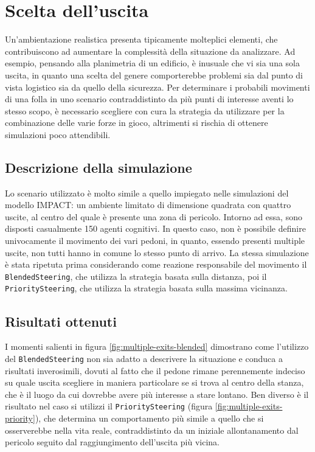 \section{Scelta dell'uscita}
Un'ambientazione realistica presenta tipicamente molteplici elementi, che contribuiscono ad aumentare la complessità della situazione da analizzare. \newline 
Ad esempio, pensando alla planimetria di un edificio, è inusuale che vi sia una sola uscita, in quanto una scelta del genere comporterebbe problemi sia dal punto di vista logistico sia da quello della sicurezza. \newline
Per determinare i probabili movimenti di una folla in uno scenario contraddistinto da più punti di interesse aventi lo stesso scopo, è necessario scegliere con cura la strategia da utilizzare per la combinazione delle varie forze in gioco, altrimenti si rischia di ottenere simulazioni poco attendibili.

\subsection{Descrizione della simulazione}
Lo scenario utilizzato è molto simile a quello impiegato nelle simulazioni del modello IMPACT: un ambiente limitato di dimensione quadrata con quattro uscite, al centro del quale è presente una zona di pericolo. Intorno ad essa, sono disposti casualmente 150 agenti cognitivi. \newline
In questo caso, non è possibile definire univocamente il movimento dei vari pedoni, in quanto, essendo presenti multiple uscite, non tutti hanno in comune lo stesso punto di arrivo. \newline
La stessa simulazione è stata ripetuta prima considerando come reazione responsabile del movimento il \texttt{BlendedSteering}, che utilizza la strategia basata sulla distanza, poi il \texttt{PrioritySteering}, che utilizza la strategia basata sulla massima vicinanza.

\subsection{Risultati ottenuti}
I momenti salienti in figura \ref{fig:multiple-exits-blended} dimostrano come l'utilizzo del \texttt{BlendedSteering} non sia adatto a descrivere la situazione e conduca a risultati inverosimili, dovuti al fatto che il pedone rimane perennemente indeciso su quale uscita scegliere in maniera particolare se si trova al centro della stanza, che è il luogo da cui dovrebbe avere più interesse a stare lontano. \newline
Ben diverso è il risultato nel caso si utilizzi il \texttt{PrioritySteering} (figura \ref{fig:multiple-exits-priority}), che determina un comportamento più simile a quello che si osserverebbe nella vita reale, contraddistinto da un iniziale allontanamento dal pericolo seguito dal raggiungimento dell'uscita più vicina.

